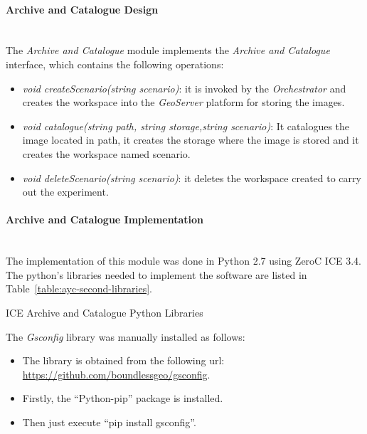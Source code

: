 \paragraph{Archive and Catalogue Design}~\\

The \emph{Archive and Catalogue} module implements the \emph{Archive and
  Catalogue} interface, which contains the following operations:

\begin{itemize}
\item \emph{void createScenario(string scenario)}: it is invoked by the
  \emph{Orchestrator} and creates the workspace into the \emph{GeoServer}
  platform for storing the images.
\item \emph{void catalogue(string path, string storage,string scenario)}: It
  catalogues the image located in path, it creates the storage where the image is
  stored and it creates the workspace named scenario.
\item \emph{void deleteScenario(string scenario)}: it deletes the workspace created
  to carry out the experiment.
\end{itemize}


\paragraph{Archive and Catalogue Implementation}~\\

The implementation of this module was done in Python 2.7 using ZeroC ICE 3.4. The
python's libraries needed to implement the software are listed in
Table~\ref{table:ayc-second-libraries}.

\begin{table}[hp]
  \centering
  {\small
  
  }
  \caption{ICE Archive and Catalogue Python Libraries}
  \label{table:ayc-second-libraries}
\end{table}

The \emph{Gsconfig} library was manually installed as follows:
\begin{itemize}
\item The library is obtained from the following url: \url{https://github.com/boundlessgeo/gsconfig}.
\item Firstly, the ``Python-pip''  package is installed.
\item Then just execute ``pip install gsconfig''.
\end{itemize}

